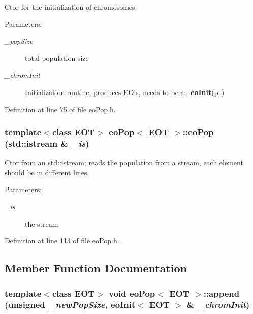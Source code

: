 Ctor for the initialization of chromosomes. 

\begin{Desc}
\item[Parameters:]
\begin{description}
\item[{\em \_\-pop\-Size}]total population size \item[{\em \_\-chrom\-Init}]Initialization routine, produces EO's, needs to be an {\bf eo\-Init}{\rm (p.\,\pageref{classeo_init})}\end{description}
\end{Desc}


Definition at line 75 of file eo\-Pop.h.
\subsubsection{\setlength{\rightskip}{0pt plus 5cm}template$<$class EOT$>$ {\bf eo\-Pop}$<$ {\bf EOT} $>$::{\bf eo\-Pop} (std::istream \& {\em \_\-is})\hspace{0.3cm}{\tt  [inline]}}\label{classeo_pop_a3}


Ctor from an std::istream; reads the population from a stream, each element should be in different lines. 

\begin{Desc}
\item[Parameters:]
\begin{description}
\item[{\em \_\-is}]the stream \end{description}
\end{Desc}


Definition at line 113 of file eo\-Pop.h.

\subsection{Member Function Documentation}
\subsubsection{\setlength{\rightskip}{0pt plus 5cm}template$<$class EOT$>$ void {\bf eo\-Pop}$<$ {\bf EOT} $>$::append (unsigned {\em \_\-new\-Pop\-Size}, {\bf eo\-Init}$<$ {\bf EOT} $>$ \& {\em \_\-chrom\-Init})\hspace{0.3cm}{\tt  [inline]}}\label{classeo_pop_a2}


